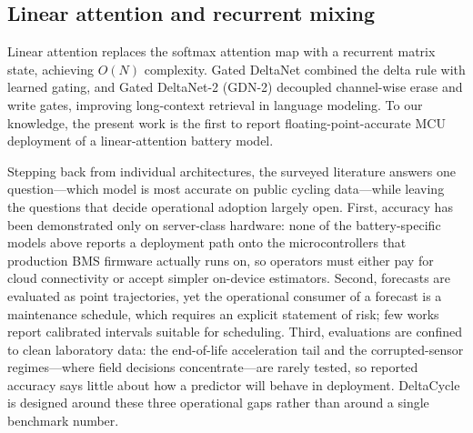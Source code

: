\subsection{Linear attention and recurrent mixing}

Linear attention replaces the softmax attention map with a recurrent
matrix state, achieving $O(N)$ complexity. Gated DeltaNet
\cite{ref_gdn} combined the delta rule with learned gating, and
Gated DeltaNet-2 (GDN-2) \cite{ref_gdn2} decoupled channel-wise erase
and write gates, improving long-context retrieval in language
modeling. To our knowledge, the present work is the first to report
floating-point-accurate MCU deployment of a linear-attention battery model.

Stepping back from individual architectures, the surveyed literature
answers one question---which model is most accurate on public cycling
data---while leaving the questions that decide operational adoption
largely open. First, accuracy has been demonstrated only on
server-class hardware: none of the battery-specific models above
reports a deployment path onto the microcontrollers that production
BMS firmware actually runs on, so operators must either pay for
cloud connectivity or accept simpler on-device estimators. Second,
forecasts are evaluated as point trajectories, yet the operational
consumer of a forecast is a maintenance schedule, which requires an
explicit statement of risk; few works report calibrated intervals
suitable for scheduling. Third, evaluations are confined to clean
laboratory data: the end-of-life acceleration tail and the
corrupted-sensor regimes---where field decisions concentrate---are
rarely tested, so reported accuracy says little about how a
predictor will behave in deployment. DeltaCycle is designed around
these three operational gaps rather than around a single benchmark
number.
